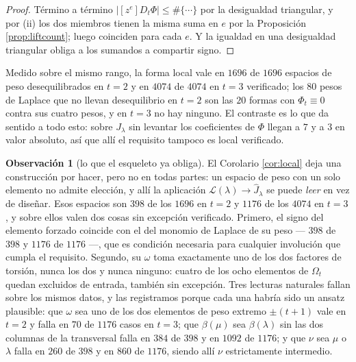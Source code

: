 \documentclass[11pt,reqno]{amsart}
\newcommand{\stverif}{\textcolor{hverif}{\small verificado}}
\theoremstyle{plain}
\theoremstyle{definition}
\newtheorem{remark}[theorem]{Observación}
\begin{document}
\begin{proof}
Término a término $|[z^e]D_t\Phi|\le\#\{\cdots\}$ por la desigualdad triangular, y por (ii) los dos
miembros tienen la misma suma en $e$ por la Proposición \ref{prop:liftcount}; luego coinciden
para cada $e$. Y la igualdad en una desigualdad
triangular obliga a los sumandos a compartir signo.
\end{proof}

Medido sobre el mismo rango, la forma local vale en $1696$ de $1696$ espacios de peso
desequilibrados en $t=2$ y en $4074$ de $4074$ en $t=3$ \stverif; los $80$ pesos de Laplace que no
llevan desequilibrio en $t=2$ son las $20$ formas con $\Phi_t\equiv0$ contra sus cuatro pesos, y en
$t=3$ no hay ninguno. El contraste es lo que da sentido a todo esto: sobre $J_\lambda$ sin levantar
los coeficientes de $\Phi$ llegan a $7$ y a $3$ en valor absoluto, así que allí el requisito tampoco
es local \stverif.

\begin{remark}[lo que el esqueleto ya obliga]\label{rem:skeleton}
El Corolario \ref{cor:local} deja una construcción por hacer, pero no en todas partes: un espacio de
peso con un solo elemento no admite elección, y allí la aplicación
$\mathcal L(\lambda)\to\widehat J_\lambda$ se puede \emph{leer} en vez de diseñar. Esos espacios son
$398$ de los $1696$ en $t=2$ y $1176$ de los $4074$ en $t=3$, y sobre ellos valen dos cosas sin
excepción \stverif. Primero, el signo del elemento forzado coincide con el del monomio de Laplace de
su peso --- $398$ de $398$ y $1176$ de $1176$ ---, que es condición necesaria para cualquier
involución que cumpla el requisito. Segundo, su $\omega$ toma exactamente uno de los dos factores de
torsión, nunca los dos y nunca ninguno: cuatro de los ocho elementos de $\Omega_t$ quedan excluidos
de entrada, también sin excepción. Tres lecturas naturales fallan sobre los mismos datos, y las
registramos porque cada una habría sido un ansatz plausible: que $\omega$ sea uno de los dos
elementos de peso extremo $\pm(t+1)$ vale en $t=2$ y falla en $70$ de $1176$ casos en $t=3$; que
$\beta(\mu)$ sea $\beta(\lambda)$ sin las dos columnas de la transversal falla en $384$ de $398$ y
en $1092$ de $1176$; y que $\nu$ sea $\mu$ o $\lambda$ falla en $260$ de $398$ y en $860$ de $1176$,
siendo allí $\nu$ estrictamente intermedio.
\end{remark}
\end{document}
